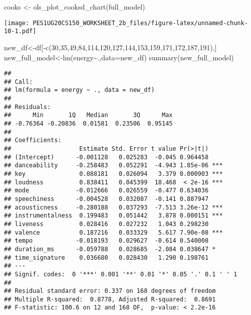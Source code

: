 \documentclass[
]{article}
\newenvironment{Shaded}{\begin{snugshade}}{\end{snugshade}}
\newcommand{\AttributeTok}[1]{\textcolor[rgb]{0.77,0.63,0.00}{#1}}
\newcommand{\DecValTok}[1]{\textcolor[rgb]{0.00,0.00,0.81}{#1}}
\newcommand{\FunctionTok}[1]{\textcolor[rgb]{0.00,0.00,0.00}{#1}}
\newcommand{\NormalTok}[1]{#1}
\newcommand{\OtherTok}[1]{\textcolor[rgb]{0.56,0.35,0.01}{#1}}
\newcommand{\SpecialCharTok}[1]{\textcolor[rgb]{0.00,0.00,0.00}{#1}}
\begin{document}
\begin{Shaded}
\begin{Highlighting}[]
\NormalTok{cooks }\OtherTok{\textless{}{-}} \FunctionTok{ols\_plot\_cooksd\_chart}\NormalTok{(full\_model)}
\end{Highlighting}
\end{Shaded}

\texttt{[image: PES1UG20CS150\_WORKSHEET\_2b\_files/figure-latex/unnamed-chunk-10-1.pdf]}

\begin{Shaded}
\begin{Highlighting}[]
\NormalTok{new\_df}\OtherTok{\textless{}{-}}\NormalTok{df[}\SpecialCharTok{{-}}\FunctionTok{c}\NormalTok{(}\DecValTok{30}\NormalTok{,}\DecValTok{35}\NormalTok{,}\DecValTok{49}\NormalTok{,}\DecValTok{84}\NormalTok{,}\DecValTok{114}\NormalTok{,}\DecValTok{120}\NormalTok{,}\DecValTok{127}\NormalTok{,}\DecValTok{144}\NormalTok{,}\DecValTok{153}\NormalTok{,}\DecValTok{159}\NormalTok{,}\DecValTok{171}\NormalTok{,}\DecValTok{172}\NormalTok{,}\DecValTok{187}\NormalTok{,}\DecValTok{191}\NormalTok{),]}
\NormalTok{new\_full\_model}\OtherTok{\textless{}{-}}\FunctionTok{lm}\NormalTok{(energy}\SpecialCharTok{\textasciitilde{}}\NormalTok{.,}\AttributeTok{data=}\NormalTok{new\_df)}
\FunctionTok{summary}\NormalTok{(new\_full\_model)}
\end{Highlighting}
\end{Shaded}

\begin{verbatim}
## 
## Call:
## lm(formula = energy ~ ., data = new_df)
## 
## Residuals:
##      Min       1Q   Median       3Q      Max 
## -0.76364 -0.20836  0.01581  0.23506  0.95145 
## 
## Coefficients:
##                   Estimate Std. Error t value Pr(>|t|)    
## (Intercept)      -0.001128   0.025283  -0.045 0.964458    
## danceability     -0.258483   0.052291  -4.943 1.85e-06 ***
## key               0.088181   0.026094   3.379 0.000903 ***
## loudness          0.838411   0.045399  18.468  < 2e-16 ***
## mode             -0.012666   0.026559  -0.477 0.634036    
## speechiness      -0.004528   0.032087  -0.141 0.887947    
## acousticness     -0.280188   0.037293  -7.513 3.26e-12 ***
## instrumentalness  0.199483   0.051442   3.878 0.000151 ***
## liveness          0.028416   0.027232   1.043 0.298230    
## valence           0.187216   0.033329   5.617 7.90e-08 ***
## tempo            -0.018193   0.029627  -0.614 0.540008    
## duration_ms      -0.059788   0.028685  -2.084 0.038647 *  
## time_signature    0.036680   0.028430   1.290 0.198761    
## ---
## Signif. codes:  0 '***' 0.001 '**' 0.01 '*' 0.05 '.' 0.1 ' ' 1
## 
## Residual standard error: 0.337 on 168 degrees of freedom
## Multiple R-squared:  0.8778, Adjusted R-squared:  0.8691 
## F-statistic: 100.6 on 12 and 168 DF,  p-value: < 2.2e-16
\end{verbatim}
\end{document}
